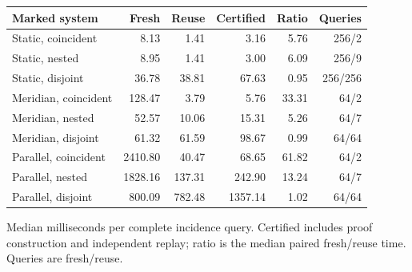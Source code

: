 \begin{center}\small
\begin{tabular}{@{}lrrrrr@{}}
\toprule
Marked system & Fresh & Reuse & Certified & Ratio & Queries \\
\midrule
Static, coincident & 8.13 & 1.41 & 3.16 & 5.76 & 256/2 \\
Static, nested & 8.95 & 1.41 & 3.00 & 6.09 & 256/9 \\
Static, disjoint & 36.78 & 38.81 & 67.63 & 0.95 & 256/256 \\
Meridian, coincident & 128.47 & 3.79 & 5.76 & 33.31 & 64/2 \\
Meridian, nested & 52.57 & 10.06 & 15.31 & 5.26 & 64/7 \\
Meridian, disjoint & 61.32 & 61.59 & 98.67 & 0.99 & 64/64 \\
Parallel, coincident & 2410.80 & 40.47 & 68.65 & 61.82 & 64/2 \\
Parallel, nested & 1828.16 & 137.31 & 242.90 & 13.24 & 64/7 \\
Parallel, disjoint & 800.09 & 782.48 & 1357.14 & 1.02 & 64/64 \\
\bottomrule
\end{tabular}
\end{center}
Median milliseconds per complete incidence query. Certified includes proof construction and independent replay; ratio is the median paired fresh/reuse time. Queries are fresh/reuse.
